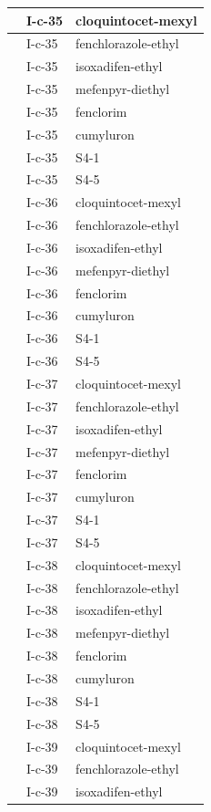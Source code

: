 \documentclass[11pt,a4paper]{article}
\begin{document}
\begin{table}[h]
\begin{tabular}{|l|l|l|}
 & I-c-35 & cloquintocet-mexyl \\ \hline
 & I-c-35 & fenchlorazole-ethyl \\ \hline
 & I-c-35 & isoxadifen-ethyl \\ \hline
 & I-c-35 & mefenpyr-diethyl \\ \hline
 & I-c-35 & fenclorim \\ \hline
 & I-c-35 & cumyluron \\ \hline
 & I-c-35 & S4-1 \\ \hline
 & I-c-35 & S4-5 \\ \hline
 & I-c-36 & cloquintocet-mexyl \\ \hline
 & I-c-36 & fenchlorazole-ethyl \\ \hline
 & I-c-36 & isoxadifen-ethyl \\ \hline
 & I-c-36 & mefenpyr-diethyl \\ \hline
 & I-c-36 & fenclorim \\ \hline
 & I-c-36 & cumyluron \\ \hline
 & I-c-36 & S4-1 \\ \hline
 & I-c-36 & S4-5 \\ \hline
 & I-c-37 & cloquintocet-mexyl \\ \hline
 & I-c-37 & fenchlorazole-ethyl \\ \hline
 & I-c-37 & isoxadifen-ethyl \\ \hline
 & I-c-37 & mefenpyr-diethyl \\ \hline
 & I-c-37 & fenclorim \\ \hline
 & I-c-37 & cumyluron \\ \hline
 & I-c-37 & S4-1 \\ \hline
 & I-c-37 & S4-5 \\ \hline
 & I-c-38 & cloquintocet-mexyl \\ \hline
 & I-c-38 & fenchlorazole-ethyl \\ \hline
 & I-c-38 & isoxadifen-ethyl \\ \hline
 & I-c-38 & mefenpyr-diethyl \\ \hline
 & I-c-38 & fenclorim \\ \hline
 & I-c-38 & cumyluron \\ \hline
 & I-c-38 & S4-1 \\ \hline
 & I-c-38 & S4-5 \\ \hline
 & I-c-39 & cloquintocet-mexyl \\ \hline
 & I-c-39 & fenchlorazole-ethyl \\ \hline
 & I-c-39 & isoxadifen-ethyl \\ \hline

\end{tabular}
\end{table}
\end{document}
